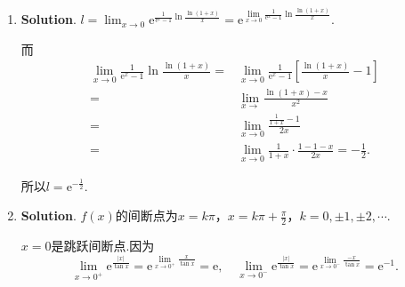 \documentclass[../Main.tex]{subfiles}
\begin{document}
\begin{enumerate}
          从而得
          \[
              a=\lim_{x\to+\infty}\frac{\sqrt{2x^{2}+4x-1}}{x}=\lim_{x\to+\infty}\sqrt{2+\frac{4}{x}-\frac{1}{x^{2}}}
              =\sqrt{2}.
          \]

          \[
              \begin{aligned}
                  b = & \lim_{x\to+\infty}\left(\sqrt{2x^2+4x-1}-ax\right)=\lim_{x\to\infty}\left(\sqrt{2x^2+4x-1}-\sqrt{2}x\right) \\
                  =   & \lim_{x\to+\infty}\sqrt{2}x\left[\sqrt{1+\left(\frac{2}{x}-\frac{1}{2x^2}\right)}-1\right]                  \\
                  =   & \lim_{x\to+\infty}\sqrt{2}x\cdot\frac{1}{2}\left(\frac{2}{x}-\frac{1}{2x^2}\right)=\sqrt{2}.
              \end{aligned}
          \]

    \item \textbf{Solution}. $l=\lim_{x\to0}\mathrm{e}^{\frac{1}{\mathrm{e}^{x}-1}\ln\frac{\ln(1+x)}{x}}
              =\mathrm{e}^{\lim\limits_{x\to0}\frac{1}{\mathrm{e}^{x}-1}\ln\frac{\ln(1+x)}{x}}$.

          而
          \[
              \begin{aligned}
                  \lim_{x\to0}\frac{1}{\mathrm{e}^x-1}\ln\frac{\ln(1+x)}{x}= & \lim_{x\to0}\frac{1}{\mathrm{e}^x-1}\left[\frac{\ln(1+x)}{x}-1\right] \\
                  =                                                          & \lim_{x\to}\frac{\ln(1+x)-x}{x^2}                                     \\
                  =                                                          & \lim_{x\to0}\frac{\frac{1}{1+x}-1}{2x}                                \\
                  =                                                          & \lim_{x\to0}\frac{1}{1+x}\cdot\frac{1-1-x}{2x}=-\frac{1}{2}.
              \end{aligned}
          \]

          所以$l=\mathrm{e}^{-\frac{1}{2}}$.

    \item \textbf{Solution}. $f(x)$的间断点为$x=k\pi$，$x=k\pi+\frac{\pi}{2}$，$k
              =0,\pm1,\pm2,\cdots$.

          $x=0$是跳跃间断点.因为
          \[
              \lim_{x\to0^+}\mathrm{e}^{\frac{|x|}{\tan x}}=\mathrm{e}^{\lim\limits_{x\to0^+}\frac{x}{\tan
                      x}}=\mathrm{e},\quad \lim_{x\to0^-}\mathrm{e}^{\frac{|x|}{\tan x}}=\mathrm{e}
              ^{\lim_{x\to0^-}\frac{-x}{\tan x}}=\mathrm{e}^{-1}.
          \]


\end{enumerate}
\end{document}
